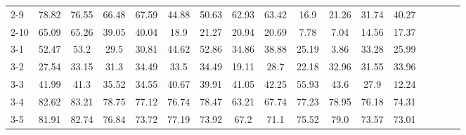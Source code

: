 \begin{table*}
{\begin{tabular}{l|cccc|cccc|cccccccc}
2-9 & \cellcolor{Green!2.2}78.82 & \cellcolor{Green!2.6}76.55 & \cellcolor{Green!4.8}66.48 & \cellcolor{Green!5.4}67.59 & \cellcolor{Green!20.2}44.88 & \cellcolor{Green!6.4}50.63 & \cellcolor{Green!10.6}62.93 & \cellcolor{Green!4.4}63.42 & \cellcolor{Green!2.4}16.9 & \cellcolor{Green!23.2}21.26 & \cellcolor{Green!1.0}31.74 & \cellcolor{Green!3.2}40.27 \\
2-10 & \cellcolor{Green!0.0}65.09 & \cellcolor{Green!0.0}65.26 & \cellcolor{Green!0.0}39.05 & \cellcolor{Green!0.0}40.04 & \cellcolor{Green!0.0}18.9 & \cellcolor{Green!0.0}21.27 & \cellcolor{Green!0.0}20.94 & \cellcolor{Green!0.0}20.69 & \cellcolor{Green!0.0}7.78 & \cellcolor{Green!0.0}7.04 & \cellcolor{Green!0.0}14.56 & \cellcolor{Green!0.0}17.37 \\
\hline
3-1 & \cellcolor{Green!0.4}52.47 & \cellcolor{Green!0.4}53.2 & \cellcolor{Green!1.2}29.5 & \cellcolor{Green!1.2}30.81 & \cellcolor{Green!8.4}44.62 & \cellcolor{Green!3.4}52.86 & \cellcolor{Green!7.0}34.86 & \cellcolor{Green!7.4}38.88 & \cellcolor{Green!0.0}25.19 & \cellcolor{Green!0.2}3.86 & \cellcolor{Green!5.8}33.28 & \cellcolor{Green!0.4}25.99 \\
3-2 & \cellcolor{Green!0.0}27.54 & \cellcolor{Green!0.0}33.15 & \cellcolor{Green!0.0}31.3 & \cellcolor{Green!0.0}34.49 & \cellcolor{Green!0.0}33.5 & \cellcolor{Green!0.0}34.49 & \cellcolor{Green!0.0}19.11 & \cellcolor{Green!0.0}28.7 & \cellcolor{Green!0.0}22.18 & \cellcolor{Green!0.0}32.96 & \cellcolor{Green!0.0}31.55 & \cellcolor{Green!0.0}33.96 \\
3-3 & \cellcolor{Green!25.0}41.99 & \cellcolor{Green!23.8}41.3 & \cellcolor{Green!29.0}35.52 & \cellcolor{Green!32.4}34.55 & \cellcolor{Green!24.6}40.67 & \cellcolor{Green!26.2}39.91 & \cellcolor{Green!23.0}41.05 & \cellcolor{Green!22.6}42.25 & \cellcolor{Green!5.4}55.93 & \cellcolor{Green!11.6}43.6 & \cellcolor{Green!35.4}27.9 & \cellcolor{Green!26.0}12.24 \\
3-4 & \cellcolor{Green!0.4}82.62 & \cellcolor{Green!0.4}83.21 & \cellcolor{Green!3.8}78.75 & \cellcolor{Green!5.6}77.12 & \cellcolor{Green!7.6}76.74 & \cellcolor{Green!6.0}78.47 & \cellcolor{Green!21.8}63.21 & \cellcolor{Green!18.8}67.74 & \cellcolor{Green!2.4}77.23 & \cellcolor{Green!1.4}78.95 & \cellcolor{Green!3.8}76.18 & \cellcolor{Green!5.6}74.31 \\
3-5 & \cellcolor{Green!0.4}81.91 & \cellcolor{Green!0.4}82.74 & \cellcolor{Green!4.0}76.84 & \cellcolor{Green!5.4}73.72 & \cellcolor{Green!7.4}77.19 & \cellcolor{Green!11.6}73.92 & \cellcolor{Green!16.6}67.2 & \cellcolor{Green!13.0}71.1 & \cellcolor{Green!2.0}75.52 & \cellcolor{Green!1.2}79.0 & \cellcolor{Green!5.0}73.57 & \cellcolor{Green!5.4}73.01 \\

\end{tabular}}
\end{table*}
